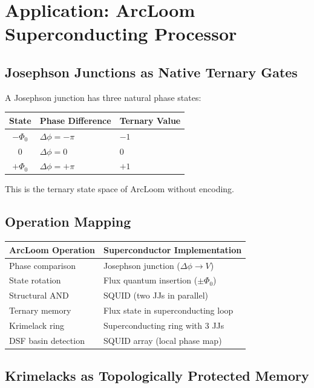 \documentclass[11pt, a4paper]{article}
\begin{document}
\section{Application: ArcLoom Superconducting Processor}

\subsection{Josephson Junctions as Native Ternary Gates}

A Josephson junction has three natural phase states:
\begin{center}
\begin{tabular}{@{}cll@{}}
\toprule
\textbf{State} & \textbf{Phase Difference} & \textbf{Ternary Value} \\
\midrule
$-\Phi_0$ & $\Delta\phi = -\pi$ & $-1$ \\
$0$ & $\Delta\phi = 0$ & $0$ \\
$+\Phi_0$ & $\Delta\phi = +\pi$ & $+1$ \\
\bottomrule
\end{tabular}
\end{center}

This is the ternary state space of ArcLoom without encoding.

\subsection{Operation Mapping}

\begin{center}
\begin{tabular}{@{}ll@{}}
\toprule
\textbf{ArcLoom Operation} & \textbf{Superconductor Implementation} \\
\midrule
Phase comparison & Josephson junction ($\Delta\phi \to V$) \\
State rotation & Flux quantum insertion ($\pm\Phi_0$) \\
Structural AND & SQUID (two JJs in parallel) \\
Ternary memory & Flux state in superconducting loop \\
Krimelack ring & Superconducting ring with 3 JJs \\
DSF basin detection & SQUID array (local phase map) \\
\bottomrule
\end{tabular}
\end{center}

\subsection{Krimelacks as Topologically Protected Memory}
\end{document}
